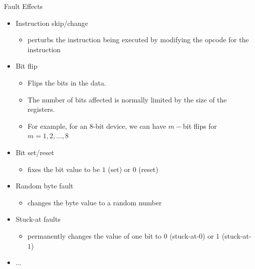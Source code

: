 
\begin{frame}{Fault Effects}
    \begin{itemize}
        \item Instruction skip/change
        \begin{itemize}
            \item perturbs the instruction being executed by modifying the opcode for the instruction
        \end{itemize}
        \item Bit flip
        \begin{itemize}
            \item Flips the bits in the data.
             \item The number of bits affected is normally limited by the size of the registers.
             \item For example, for an 8-bit device, we can have $m-$bit flips for $m=1,2,\dots,8$
        \end{itemize}
        \item Bit set/reset
        \begin{itemize}
            \item fixes the bit value to be $1$ (set) or $0$ (reset)
        \end{itemize}
        \item Random byte fault
        \begin{itemize}
            \item changes the byte value to a random number
        \end{itemize}
        \item Stuck-at faults
        \begin{itemize}
            \item permanently changes the value of one bit to $0$ (stuck-at-$0$) or $1$ (stuck-at-$1$)
        \end{itemize}
        \item ...
    \end{itemize}
\end{frame}

